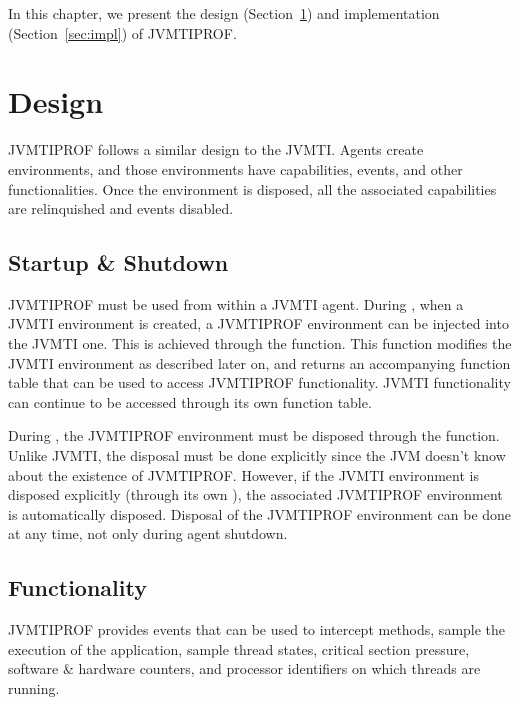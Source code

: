 

In this chapter, we present the design (Section~\ref{sec:design}) and implementation (Section~\ref{sec:impl}) of JVMTIPROF.

\section{Design} \label{sec:design}

JVMTIPROF follows a similar design to the JVMTI. Agents create environments, and those environments have capabilities, events, and other functionalities. Once the environment is disposed, all the associated capabilities are relinquished and events disabled.

\subsection{Startup \& Shutdown}

JVMTIPROF must be used from within a JVMTI agent. During , when a JVMTI environment is created, a JVMTIPROF environment can be injected into the JVMTI one. This is achieved through the  function. This function modifies the JVMTI environment as described later on, and returns an accompanying function table that can be used to access JVMTIPROF functionality. JVMTI functionality can continue to be accessed through its own function table.

During , the JVMTIPROF environment must be disposed through the  function. Unlike JVMTI, the disposal must be done explicitly since the JVM doesn't know about the existence of JVMTIPROF. However, if the JVMTI environment is disposed explicitly (through its own ), the associated JVMTIPROF environment is automatically disposed. Disposal of the JVMTIPROF environment can be done at any time, not only during agent shutdown.

\subsection{Functionality}

JVMTIPROF provides events that can be used to intercept methods, sample the execution of the application, sample thread states, critical section pressure, software \& hardware counters, and processor identifiers on which threads are running.

